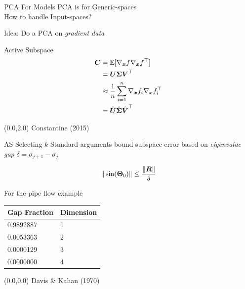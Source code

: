 \documentclass[14pt]{beamer}
\begin{document}
\begin{frame}{PCA For Models}
  PCA is for Generic-spaces \\
  How to handle Input-spaces?

  \bigskip Idea: Do a PCA on \emph{gradient data}
\end{frame}


\begin{frame}{Active Subspace}
  \begin{equation*} \begin{aligned}
      \boldsymbol{C} &= \mathbb{E}[\nabla_{\boldsymbol{x}}f\nabla_{\boldsymbol{x}}f^{\top}] \\
          &= \boldsymbol{U}\boldsymbol{\Sigma}\boldsymbol{V}^{\top} \\
          &\approx \frac{1}{n}\sum_{i=1}^n \nabla_{\boldsymbol{x}}f_i\nabla_{\boldsymbol{x}}f^{\top}_i \\
          &= \hat{\boldsymbol{U}}\hat{\boldsymbol{\Sigma}}\hat{\boldsymbol{V}}^{\top}
  \end{aligned} \end{equation*}

  \begin{textblock}{5}(0.0,2.0)
    {\tiny Constantine (2015)}
  \end{textblock}
\end{frame}

\begin{frame}{AS Selecting $k$}
  Standard arguments bound subspace error based on \emph{eigenvalue gap} $\delta
  = \sigma_{j+1} - \sigma_j$

  \begin{equation*}
    \|\sin(\boldsymbol{\Theta}_0)\| \leq \frac{\|\boldsymbol{R}\|}{\delta}
  \end{equation*}

  For the pipe flow example
  \begin{table}
    \centering
    \begin{tabular}{@{}ll@{}}
      \hline
      Gap Fraction & Dimension\\
      \hline
      0.9892887 & 1\\
      \hline
      0.0053363 & 2\\
      \hline
      0.0000129 & 3\\
      \hline
      0.0000000 & 4\\
      \hline
    \end{tabular}
  \end{table}

  \begin{textblock}{5}(0.0,0.0)
    {\tiny Davis \& Kahan (1970)}
  \end{textblock}
\end{frame}
\end{document}

